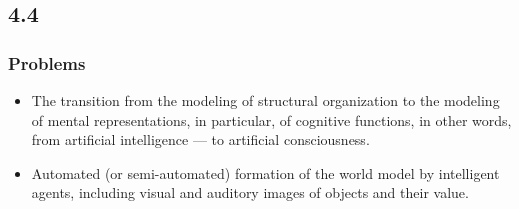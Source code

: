 \documentclass[default]{beamer}
\begin{document}
	\subsection{4.4}
	\begin{frame}
		\frametitle{Problems}
		
		\begin{itemize}
			\item The transition from the modeling of structural organization to the modeling of mental representations, in particular, of cognitive functions, in other words, from artificial intelligence --- to artificial consciousness.
			\item Automated (or semi-automated) formation of the world model by intelligent agents, including visual and auditory images of objects and their value.
		\end{itemize}
		
	\end{frame}
\end{document}
